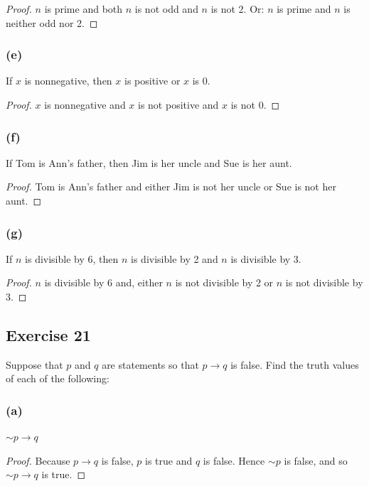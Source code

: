 \documentclass[14pt]{extarticle}
\begin{document}
\begin{proof}
$n$ is prime and both $n$ is not odd and $n$ is not 2. Or: $n$ is prime and $n$ is neither odd nor 2.
\end{proof}

\subsubsection{(e)}
If $x$ is nonnegative, then $x$ is positive or $x$ is 0.

\begin{proof}
$x$ is nonnegative and $x$ is not positive and $x$ is not 0.
\end{proof}

\subsubsection{(f)}
If Tom is Ann’s father, then Jim is her uncle and Sue is her aunt.

\begin{proof}
Tom is Ann’s father and either Jim is not her uncle or Sue is not her aunt.
\end{proof}

\subsubsection{(g)}
If $n$ is divisible by 6, then $n$ is divisible by 2 and $n$
is divisible by 3.

\begin{proof}
$n$ is divisible by 6 and, either $n$ is not divisible by 2 or $n$ is not divisible by 3.
\end{proof}

\subsection{Exercise 21}
Suppose that $p$ and $q$ are statements so that $p \to q$ is false. Find the truth values of each of the following:

\subsubsection{(a)}
${\sim p} \to q$

\begin{proof}
Because $p \to q$ is false, $p$ is true and $q$ is false. Hence ${\sim p}$ is false, and so ${\sim p} \to q$ is true. \end{proof}
\end{document}
